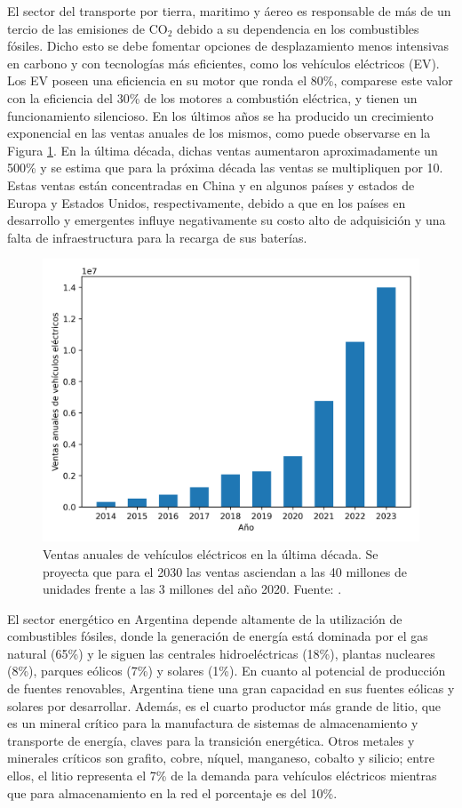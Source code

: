 El sector del transporte por tierra, maritimo y áereo es responsable de más de un 
tercio de las emisiones de CO$_2$ debido a su dependencia en los combustibles 
fósiles. Dicho esto se debe fomentar opciones de desplazamiento menos intensivas
en carbono y con tecnologías más eficientes, como los vehículos eléctricos (EV).
Los EV poseen una eficiencia en su motor que ronda el 80\%, comparese este valor 
con la eficiencia del 30\% de los motores a combustión eléctrica, y tienen un 
funcionamiento silencioso. En los últimos años se ha producido un crecimiento 
exponencial en las ventas anuales de los mismos, como puede observarse en la
Figura \ref{fig:ev-volumes}. En la última década, dichas ventas aumentaron 
aproximadamente un 500\% y se estima que para la próxima década las ventas se 
multipliquen por 10. Estas ventas están concentradas en China y en algunos países
y estados de Europa y Estados Unidos, respectivamente, debido a que en los países
en desarrollo y emergentes influye negativamente su costo alto de adquisición y 
una falta de infraestructura para la recarga de sus baterías.
\begin{figure}[h!]
    \centering
    \includegraphics[width=.8\textwidth]{Introduccion/ev-volumes.png}
    \caption{Ventas anuales de vehículos eléctricos en la última década. Se 
    proyecta que para el 2030 las ventas asciendan a las 40 millones de unidades 
    frente a las 3 millones del año 2020. Fuente: \cite{EVV}.}
    \label{fig:ev-volumes}
\end{figure}

El sector energético en Argentina depende altamente de la utilización de 
combustibles fósiles, donde la generación de energía está dominada por el gas 
natural (65\%) y le siguen las centrales hidroeléctricas (18\%), plantas nucleares
(8\%), parques eólicos (7\%) y solares (1\%). En cuanto al potencial de 
producción de fuentes renovables, Argentina tiene una gran capacidad en sus 
fuentes eólicas y solares por desarrollar. Además, es el cuarto productor más 
grande de litio, que es un mineral crítico para la manufactura de sistemas de 
almacenamiento y transporte de energía, claves para la transición energética. 
Otros metales y minerales críticos son grafito, cobre, níquel, manganeso, cobalto 
y silicio; entre ellos, el litio representa el 7\% de la demanda para vehículos 
eléctricos mientras que para almacenamiento en la red el porcentaje es del 10\%.

